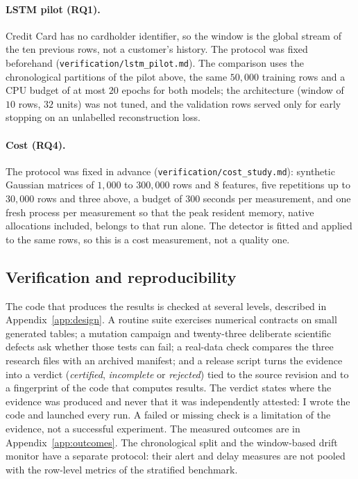 \documentclass[conference]{IEEEtran}
\begin{document}
\paragraph{LSTM pilot (RQ1).} Credit Card has no cardholder identifier, so the window is the global
stream of the ten previous rows, not a customer's history. The protocol was fixed beforehand
(\texttt{verification/lstm\_pilot.md}). The comparison uses the chronological partitions of the
pilot above, the same $50{,}000$ training rows and a CPU budget of at most $20$ epochs for both models;
the architecture (window of $10$ rows, $32$ units) was not tuned, and the validation rows served only
for early stopping on an unlabelled reconstruction loss.

\paragraph{Cost (RQ4).} The protocol was fixed in advance (\texttt{verification/cost\_study.md}):
synthetic Gaussian matrices of $1{,}000$ to $300{,}000$ rows and $8$ features, five repetitions up
to $30{,}000$ rows and three above, a budget of $300$ seconds per measurement, and one fresh
process per measurement so that the peak resident memory, native allocations included, belongs to
that run alone. The detector is fitted and applied to the same rows, so this is a cost measurement,
not a quality one.

\subsection{Verification and reproducibility}
\label{sec:verification}
The code that produces the results is checked at several levels, described in
Appendix~\ref{app:design}. A routine suite exercises numerical contracts on small
generated tables; a mutation campaign and twenty-three deliberate scientific
defects ask whether those tests can fail; a real-data check compares the
three research files with an archived manifest; and a release script turns the
evidence into a verdict (\emph{certified}, \emph{incomplete} or \emph{rejected}) tied to the
source revision and to a fingerprint of the code that computes results. The
verdict states where the evidence was produced and never that it was
independently attested: I wrote the code and launched every run. A failed or
missing check is a limitation of the evidence, not a successful experiment. The
measured outcomes are in Appendix~\ref{app:outcomes}. The chronological split and
the window-based drift monitor have a separate protocol: their alert and delay
measures are not pooled with the row-level metrics of the stratified benchmark.
\end{document}
